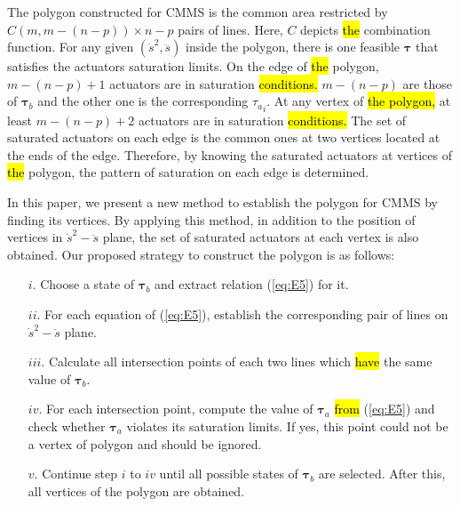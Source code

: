 \documentclass{rob}%
\begin{document}
The polygon constructed for CMMS is the common area restricted by $ C(m, m-(n-p))\times n-p $ pairs of lines. Here, $ C $ depicts \hl{the} combination function. For any given $ (\dot s^2, \ddot s) $ inside the polygon, there is one feasible $ \boldsymbol \tau $ that satisfies the actuators saturation limits. On the edge of \hl{the} polygon, $ m-(n-p)+1 $ actuators are in saturation \hl{conditions.} $ m-(n-p) $ are those of $ \boldsymbol \tau_b $  and the other one is  the corresponding $ {{\tau}_{a}}_i $. 
At any vertex of \hl{ the polygon,} at least $ m-(n-p)+2 $ actuators are in saturation \hl{conditions.} The set of saturated actuators on each edge is the common ones at two vertices located at the ends of the edge. Therefore, by knowing the saturated actuators at vertices of \hl{the} polygon, the pattern of saturation on each edge is determined.

In this paper, we present a new method to establish the polygon for CMMS by finding its vertices.
By applying this method, in addition to the position of vertices in $ {\dot s}^2-\ddot s $ plane, the set of saturated actuators at each vertex is also obtained. Our proposed strategy to construct the polygon is as follows:


\begin{itemize}
	\item[$ i. $] Choose a state of $ \boldsymbol \tau_b $ and extract relation (\ref{eq:E5}) for it.
	
	\item[$ ii. $] For each equation of (\ref{eq:E5}), establish the corresponding pair of lines on $ \dot s^2-\ddot s $ plane.
	
	\item[$ iii. $] Calculate all intersection points of each two lines which \hl{have} the same value of $ \boldsymbol \tau_b $. %
	
	\item[$ iv. $] For each intersection point, compute the value of $ \boldsymbol \tau_a $  \hl{from} (\ref{eq:E5}) and check whether $ \boldsymbol \tau_a $ violates its saturation limits. If yes, this point could not be a vertex of polygon and should be ignored.
	
	\item[$ v. $] Continue step $ i $ to $ iv $ until all possible states of $ \boldsymbol \tau_b $ are selected. After this, all vertices of the polygon are obtained.
	
\end{itemize}
\end{document}
